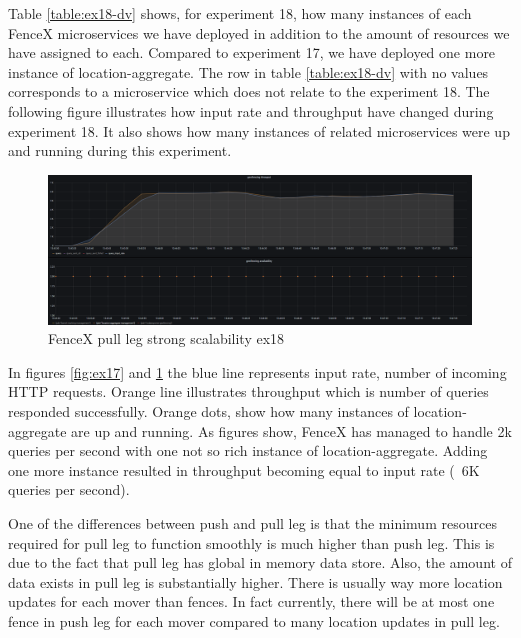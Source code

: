 \documentclass[a4]{report}
\begin{document}
    Table \ref{table:ex18-dv} shows, for experiment 18, how many instances of each FenceX microservices we have
    deployed in addition to the amount of resources we have assigned to each.
    Compared to experiment 17, we have deployed one more instance of location-aggregate.
    The row in table \ref{table:ex18-dv} with no values corresponds to a microservice which does not relate to the
    experiment 18.
    The following figure illustrates how input rate and throughput have changed during experiment 18.
    It also shows how many instances of related microservices were up and running during this experiment.

    \begin{figure}
        \caption{FenceX pull leg strong scalability ex18}
        \label{fig:ex18}
        \includegraphics[scale=0.5]{images/evaluation/ex18-benchmarking-ongoing-2per4sec.png}
    \end{figure}

    \clearpage

    In figures \ref{fig:ex17} and \ref{fig:ex18} the blue line represents input rate, number of incoming HTTP
    requests.
    Orange line illustrates throughput which is number of queries responded successfully.
    Orange dots, show how many instances of location-aggregate are up and running.
    As figures show, FenceX has managed to handle 2k queries per second with one not so rich instance of location-aggregate.
    Adding one more instance resulted in throughput becoming equal to input rate (~6K queries per second).

    One of the differences between push and pull leg is that the minimum resources required for pull leg to function
    smoothly is much higher than push leg.
    This is due to the fact that pull leg has global in memory data store.
    Also, the amount of data exists in pull leg is substantially higher.
    There is usually way more location updates for each mover than fences.
    In fact currently, there will be at most one fence in push leg for each mover compared to many location updates
    in pull leg.
\end{document}
